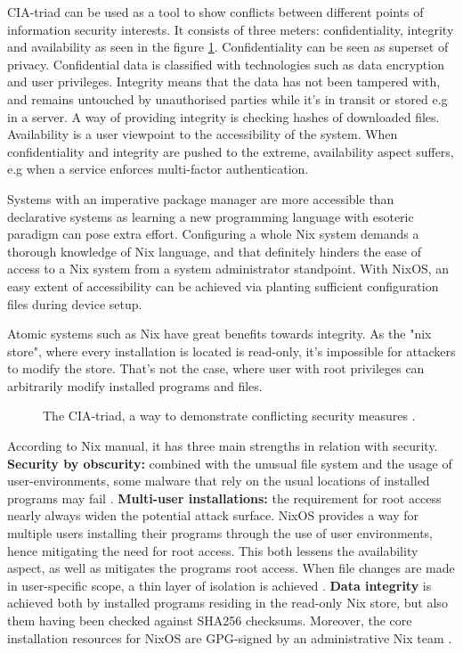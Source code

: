 CIA-triad can be used as a tool to show conflicts between different
points of information security interests. It consists of three meters:
confidentiality, integrity and availability as seen in the figure
\ref{ciatriad}. Confidentiality can be seen as superset of
privacy. Confidential data is classified with technologies such as
data encryption and user privileges. Integrity means that the data has
not been tampered with, and remains untouched by unauthorised parties
while it's in transit or stored e.g in a server. A way of providing
integrity is checking hashes of downloaded files. Availability is a
user viewpoint to the accessibility of the system. When
confidentiality and integrity are pushed to the extreme, availability
aspect suffers, e.g when a service enforces multi-factor
authentication. \cite{pender2019parkerian}

Systems with an imperative package manager are more accessible than
declarative systems as learning a new programming language with
esoteric paradigm can pose extra effort. Configuring a whole Nix
system demands a thorough knowledge of Nix language, and that
definitely hinders the ease of access to a Nix system from a system
administrator standpoint. With NixOS, an easy extent of accessibility
can be achieved via planting sufficient configuration files during
device setup.

Atomic systems such as Nix have great benefits towards integrity. As
the "nix store", where every installation is located is read-only,
it's impossible for attackers to modify the store. That's not the
case, where user with root privileges can arbitrarily modify installed
programs and files.

\begin{figure}[t!]
\centerline{}
\caption{The CIA-triad, a way to demonstrate conflicting security
  measures \cite{hughes2013quantitative}.}
\label{ciatriad}
\end{figure}

According to Nix manual, it has three main strengths in relation with
security. \textbf{Security by obscurity: }combined with the unusual
file system and the usage of user-environments, some malware that rely
on the usual locations of installed programs may fail
\cite{nixosSecurityNixOS}. \textbf{Multi-user installations: }the
requirement for root access nearly always widen the potential attack
surface. NixOS provides a way for multiple users installing their
programs through the use of user environments, hence mitigating the
need for root access. This both lessens the availability aspect, as
well as mitigates the programs root access. When file changes are made
in user-specific scope, a thin layer of isolation is achieved
\cite{nixosNixOSManual}. \textbf{Data integrity} is achieved both by
installed programs residing in the read-only Nix store, but also them
having been checked against SHA256 checksums. Moreover, the core
installation resources for NixOS are GPG-signed by an administrative
Nix team \cite{nixosSecurityNixOS}.

